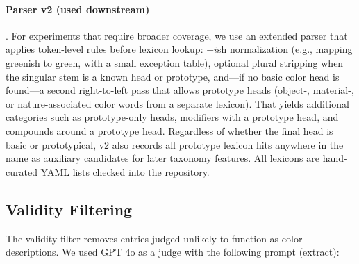 \documentclass[11pt]{article}
\begin{document}
\paragraph{Parser v2 (used downstream)}.
For experiments that require broader coverage, we use an extended parser that applies token-level rules before lexicon lookup: $-i$sh normalization (e.g., mapping greenish to green, with a small exception table), optional plural stripping when the singular stem is a known head or prototype, and—if no basic color head is found—a second right-to-left pass that allows prototype heads (object-, material-, or nature-associated color words from a separate lexicon). That yields additional categories such as prototype-only heads, modifiers with a prototype head, and compounds around a prototype head. Regardless of whether the final head is basic or prototypical, v2 also records all prototype lexicon hits anywhere in the name as auxiliary candidates for later taxonomy features. All lexicons are hand-curated YAML lists checked into the repository.


\subsection{Validity Filtering}
\label{ap:val-filtering}

The validity filter removes entries judged unlikely to function as color
descriptions. We used GPT 4o as a judge with the following prompt (extract): 
\end{document}
